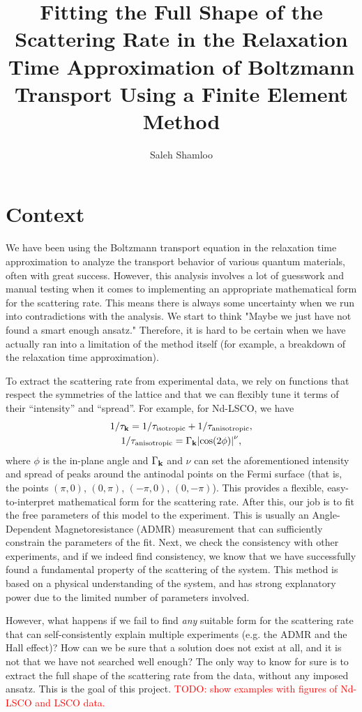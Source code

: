 \documentclass[12pt]{article}
\title{Fitting the Full Shape of the Scattering Rate in the Relaxation Time Approximation of Boltzmann Transport Using a Finite Element Method}
\author{Saleh Shamloo}
\begin{document}
\maketitle
\section{Context}
We have been using the Boltzmann transport equation in the relaxation time approximation to analyze
the transport behavior of various quantum materials, often with great success.
However, this analysis involves a lot of guesswork and manual testing when it comes to implementing
an appropriate mathematical form for the scattering rate. This means there is always some uncertainty
when we run into contradictions with the analysis. We start to think
"Maybe we just have not found a smart enough ansatz." Therefore, it is hard to be certain
when we have actually ran into a limitation of the method itself
(for example, a breakdown of the relaxation time approximation).

To extract the scattering rate from experimental data, we rely on functions that respect the symmetries
of the lattice and that we can flexibly tune it terms of their ``intensity'' and ``spread''.
For example, for Nd-LSCO, we have
\begin{gather}
    1/\tau_{\vb{k}} = 1/\tau_{\text{isotropic}} + 1/\tau_{\text{anisotropic}}, \\
    1/\tau_{\text{anisotropic}} = \Gamma_{\vb{k}}\abs{\cos(2\vb{\phi})}^{\nu},
\end{gather}
where $\phi$ is the in-plane angle and $\Gamma_{\vb{k}}$ and $\nu$ can set the aforementioned
intensity and spread of peaks around the antinodal points on the Fermi surface
(that is, the points $(\pi,0)$, $(0,\pi)$, $(-\pi,0)$, $(0,-\pi)$).
This provides a flexible, easy-to-interpret mathematical form for the scattering rate.
After this, our job is to fit the free parameters of this model to the experiment.
This is usually an Angle-Dependent Magnetoresistance (ADMR) measurement that can
sufficiently constrain the parameters of the fit.
Next, we check the consistency with other experiments, and if we indeed find consistency,
we know that we have successfully found a fundamental property of the scattering of the system.
This method is based on a physical understanding of the system, and has strong explanatory power
due to the limited number of parameters involved.

However, what happens if we fail to find \emph{any} suitable form for the scattering rate that can self-consistently explain multiple experiments (e.g. the ADMR and the Hall effect)? How can we be sure that a solution does not exist at all, and it is not that we have not searched well enough? The only way to know for sure is to extract the full shape of the scattering rate from the data, without any imposed ansatz. This is the goal of this project. \textcolor{red}{TODO: show examples with figures of Nd-LSCO and LSCO data.}
\end{document}
